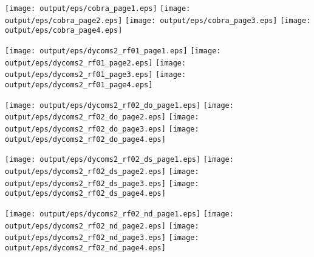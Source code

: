 \documentclass[11pt]{article}
\begin{document}
\begin{center}

\texttt{[image: output/eps/cobra\_page1.eps]}
\texttt{[image: output/eps/cobra\_page2.eps]}
\texttt{[image: output/eps/cobra\_page3.eps]}
\texttt{[image: output/eps/cobra\_page4.eps]}
\end{center}
\newpage

\begin{center}

\texttt{[image: output/eps/dycoms2\_rf01\_page1.eps]}
\texttt{[image: output/eps/dycoms2\_rf01\_page2.eps]}
\texttt{[image: output/eps/dycoms2\_rf01\_page3.eps]}
\texttt{[image: output/eps/dycoms2\_rf01\_page4.eps]}
\end{center}
\newpage

\begin{center}

\texttt{[image: output/eps/dycoms2\_rf02\_do\_page1.eps]}
\texttt{[image: output/eps/dycoms2\_rf02\_do\_page2.eps]}
\texttt{[image: output/eps/dycoms2\_rf02\_do\_page3.eps]}
\texttt{[image: output/eps/dycoms2\_rf02\_do\_page4.eps]}
\end{center}
\newpage

\begin{center}

\texttt{[image: output/eps/dycoms2\_rf02\_ds\_page1.eps]}
\texttt{[image: output/eps/dycoms2\_rf02\_ds\_page2.eps]}
\texttt{[image: output/eps/dycoms2\_rf02\_ds\_page3.eps]}
\texttt{[image: output/eps/dycoms2\_rf02\_ds\_page4.eps]}
\end{center}
\newpage

\begin{center}

\texttt{[image: output/eps/dycoms2\_rf02\_nd\_page1.eps]}
\texttt{[image: output/eps/dycoms2\_rf02\_nd\_page2.eps]}
\texttt{[image: output/eps/dycoms2\_rf02\_nd\_page3.eps]}
\texttt{[image: output/eps/dycoms2\_rf02\_nd\_page4.eps]}
\end{center}
\newpage
\end{document}
